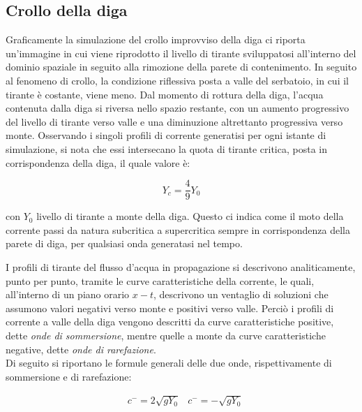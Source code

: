 \documentclass[12pt]{article} %
\begin{document}
\subsection{Crollo della diga}

\noindent Graficamente la simulazione del crollo improvviso della diga ci riporta un'immagine in cui viene riprodotto il livello di tirante sviluppatosi all'interno del dominio spaziale in seguito alla rimozione della parete di contenimento. 
In seguito al fenomeno di crollo, la condizione riflessiva posta a valle del serbatoio, in cui il tirante è costante, viene meno.
Dal momento di rottura della diga, l'acqua contenuta dalla diga si riversa nello spazio restante, con un aumento progressivo del livello di tirante verso valle e una diminuzione altrettanto progressiva verso monte. Osservando i singoli profili di corrente generatisi per ogni istante di simulazione, si nota che essi intersecano la quota di tirante critica, posta in corrispondenza della diga, il quale valore è:

\begin{equation}
    Y_c=\frac{4}{9}Y_0
\end{equation}

\noindent con $Y_0$ livello di tirante a monte della diga.
Questo ci indica come il moto della corrente passi da natura subcritica a supercritica sempre in corrispondenza della parete di diga, per qualsiasi onda generatasi nel tempo.

\noindent I profili di tirante del flusso d'acqua in propagazione si descrivono analiticamente, punto per punto, tramite le curve caratteristiche della corrente, le quali, all'interno di un piano orario $x-t$, descrivono un ventaglio di soluzioni che assumono valori negativi verso monte e positivi verso valle. Perciò i profili di corrente a valle della diga vengono descritti da curve caratteristiche positive, dette \textit{onde di sommersione}, mentre quelle a monte da curve caratteristiche negative, dette \textit{onde di rarefazione}.\\
Di seguito si riportano le formule generali delle due onde, rispettivamente di sommersione e di rarefazione:

\begin{align*}
    &c^-=2\sqrt{gY_0}
    &c^-=-\sqrt{gY_0}
\end{align*}
\end{document}
